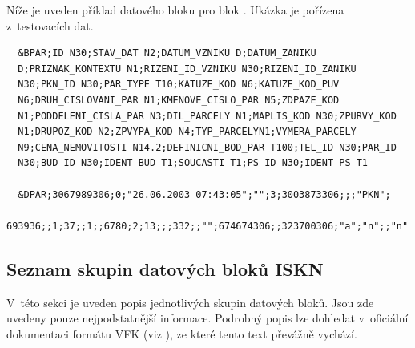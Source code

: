 \documentclass[a4paper,12pt,oneside]{book}
\begin{document}
Níže je uveden příklad datového bloku pro blok . Ukázka je
pořízena z~testovacích dat.

\begin{lstlisting}
  &BPAR;ID N30;STAV_DAT N2;DATUM_VZNIKU D;DATUM_ZANIKU
  D;PRIZNAK_KONTEXTU N1;RIZENI_ID_VZNIKU N30;RIZENI_ID_ZANIKU
  N30;PKN_ID N30;PAR_TYPE T10;KATUZE_KOD N6;KATUZE_KOD_PUV
  N6;DRUH_CISLOVANI_PAR N1;KMENOVE_CISLO_PAR N5;ZDPAZE_KOD
  N1;PODDELENI_CISLA_PAR N3;DIL_PARCELY N1;MAPLIS_KOD N30;ZPURVY_KOD
  N1;DRUPOZ_KOD N2;ZPVYPA_KOD N4;TYP_PARCELYN1;VYMERA_PARCELY
  N9;CENA_NEMOVITOSTI N14.2;DEFINICNI_BOD_PAR T100;TEL_ID N30;PAR_ID
  N30;BUD_ID N30;IDENT_BUD T1;SOUCASTI T1;PS_ID N30;IDENT_PS T1

  &DPAR;3067989306;0;"26.06.2003 07:43:05";"";3;3003873306;;;"PKN";
  693936;;1;37;;1;;6780;2;13;;;332;;"";674674306;;323700306;"a";"n";;"n"
\end{lstlisting}

\subsection*{Seznam skupin datových bloků ISKN}

V~této sekci je uveden popis jednotlivých skupin datových bloků. Jsou
zde uvedeny pouze nejpodstatnější informace. Podrobný popis lze
dohledat v~oficiální dokumentaci formátu VFK (viz \cite{vfk_struktura}),
ze které tento text převážně vychází.
\end{document}
